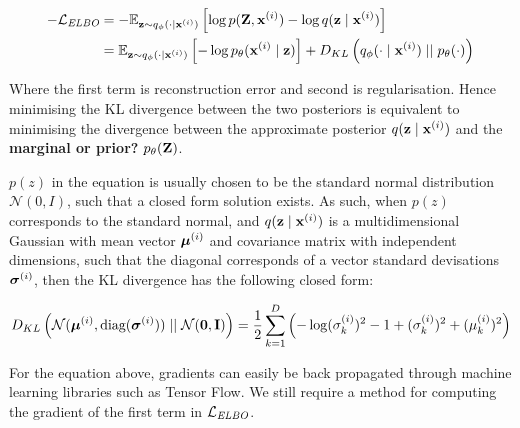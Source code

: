 



\begin{equation}
	\begin{aligned}
		- \lelbo & = - \elbo \\  
		& = \elboexplicit \label{eq:elboexplicit} \\
	\end{aligned}	
\end{equation} %

Where the first term is reconstruction error and second is regularisation. Hence minimising the KL divergence between the two posteriors is equivalent to minimising the divergence between the approximate posterior $\qzx$ and the \textbf{marginal or prior?} $\pz$.

$p(z)$ in the equation is usually chosen to be the standard normal distribution $\mathcal{N}(0, I)$, such that a closed form solution exists. As such, when $p(z)$ corresponds to the standard normal, and $\qzx$ is a multidimensional Gaussian with mean vector $\mui$ and covariance matrix with independent dimensions, such that the diagonal corresponds of a vector standard devisations $\sigmai$, then the KL divergence has the following closed form:

\begin{equation}	
	\kl{\normal}{\standardnormal} = \latentspaceconstraintclosedform
\end{equation}

For the equation above, gradients can easily be back propagated through machine learning libraries such as Tensor Flow. We still require a method for computing the gradient of the first term in $\lelbo$. %
























